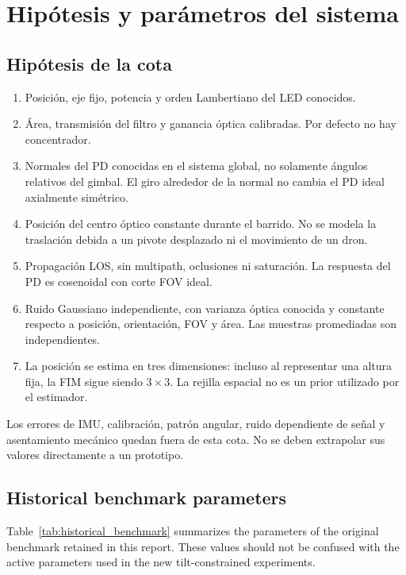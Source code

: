 \documentclass[11pt,a4paper]{article}
\begin{document}
\section{Hipótesis y parámetros del sistema}
\subsection{Hipótesis de la cota}
\begin{enumerate}
\item Posición, eje fijo, potencia y orden Lambertiano del LED conocidos.
\item Área, transmisión del filtro y ganancia óptica calibradas. Por defecto no hay concentrador.
\item Normales del PD conocidas en el sistema global, no solamente ángulos relativos del gimbal. El giro alrededor de la normal no cambia el PD ideal axialmente simétrico.
\item Posición del centro óptico constante durante el barrido. No se modela la traslación debida a un pivote desplazado ni el movimiento de un dron.
\item Propagación LOS, sin multipath, oclusiones ni saturación. La respuesta del PD es cosenoidal con corte FOV ideal.
\item Ruido Gaussiano independiente, con varianza óptica conocida y constante respecto a posición, orientación, FOV y área. Las muestras promediadas son independientes.
\item La posición se estima en tres dimensiones: incluso al representar una altura fija, la FIM sigue siendo $3\times3$. La rejilla espacial no es un prior utilizado por el estimador.
\end{enumerate}
Los errores de IMU, calibración, patrón angular, ruido dependiente de señal y asentamiento mecánico quedan fuera de esta cota. No se deben extrapolar sus valores directamente a un prototipo.

\subsection{Historical benchmark parameters}

Table~\ref{tab:historical_benchmark} summarizes the parameters of the original benchmark retained in this report. These values should not be confused with the active parameters used in the new tilt-constrained experiments.
\end{document}
